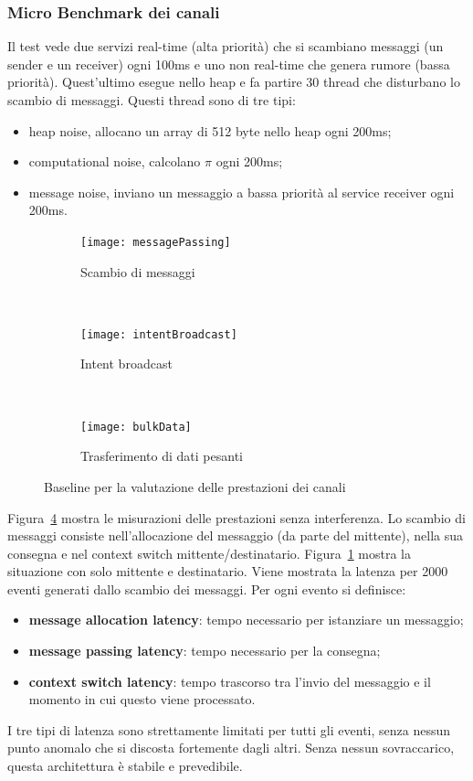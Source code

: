 \subsubsection{Micro Benchmark dei canali}
Il test vede due servizi real-time (alta priorità) che si scambiano messaggi (un sender e un receiver) ogni 100ms e uno non real-time che genera rumore (bassa priorità). Quest'ultimo esegue nello heap e fa partire 30 thread che disturbano lo scambio di messaggi. Questi thread sono di tre tipi:
\begin{itemize}
	\item heap noise, allocano un array di 512 byte nello heap ogni 200ms;
	\item computational noise, calcolano $\pi$ ogni 200ms;
	\item message noise, inviano un messaggio a bassa priorità al service receiver ogni 200ms.
\end{itemize}

\begin{figure}[h]
	\centering
	\begin{subfigure}[b]{0.3\textwidth}
		\texttt{[image: messagePassing]}
		\caption{Scambio di messaggi}
		\label{fig:messagePassing}
	\end{subfigure}
	~ 
	\begin{subfigure}[b]{0.3\textwidth}
		\texttt{[image: intentBroadcast]}
		\caption{Intent broadcast}
		\label{fig:intentBroadcast}
	\end{subfigure}
	~
	\begin{subfigure}[b]{0.3\textwidth}
		\texttt{[image: bulkData]}
		\caption{Trasferimento di dati pesanti}
		\label{fig:bulkData}
	\end{subfigure}
	\caption{Baseline per la valutazione delle prestazioni dei canali}\label{fig:baselines}
\end{figure}

Figura~\ref{fig:baselines} mostra le misurazioni delle prestazioni senza interferenza. Lo scambio di messaggi consiste nell'allocazione del messaggio (da parte del mittente), nella sua consegna e nel context switch mittente/destinatario. Figura~\ref{fig:messagePassing} mostra la situazione con solo mittente e destinatario. Viene mostrata la latenza per 2000 eventi generati dallo scambio dei messaggi. Per ogni evento si definisce:
\begin{itemize}
	\item \textbf{message allocation latency}: tempo necessario per istanziare un messaggio;
	\item \textbf{message passing latency}: tempo necessario per la consegna;
	\item \textbf{context switch latency}: tempo trascorso tra l'invio del messaggio e il momento in cui questo viene processato.
\end{itemize}
I tre tipi di latenza sono strettamente limitati per tutti gli eventi, senza nessun punto anomalo che si discosta fortemente dagli altri. Senza nessun sovraccarico, questa architettura è stabile e prevedibile.

